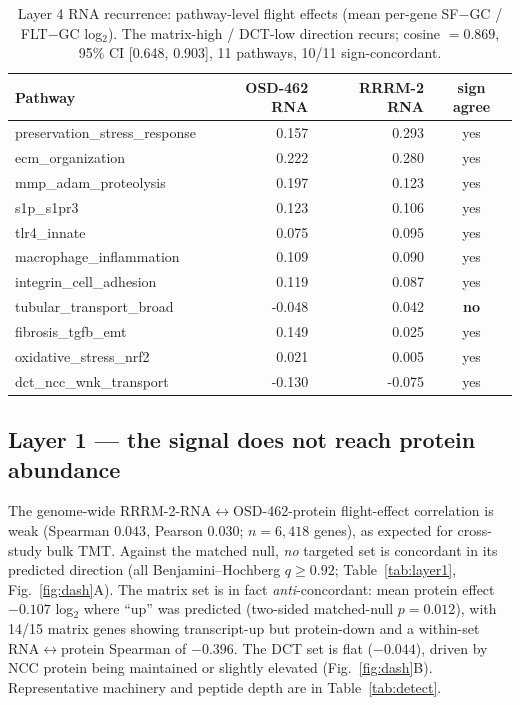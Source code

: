 \documentclass[11pt]{article}
\begin{document}
\begin{table}[htbp]
\centering
\small
\begin{tabular}{lrrc}
\toprule
Pathway & OSD-462 RNA & RRRM-2 RNA & sign agree \\
\midrule
preservation\_stress\_response & 0.157 & 0.293 & yes \\
ecm\_organization & 0.222 & 0.280 & yes \\
mmp\_adam\_proteolysis & 0.197 & 0.123 & yes \\
s1p\_s1pr3 & 0.123 & 0.106 & yes \\
tlr4\_innate & 0.075 & 0.095 & yes \\
macrophage\_inflammation & 0.109 & 0.090 & yes \\
integrin\_cell\_adhesion & 0.119 & 0.087 & yes \\
tubular\_transport\_broad & -0.048 & 0.042 & \textbf{no} \\
fibrosis\_tgfb\_emt & 0.149 & 0.025 & yes \\
oxidative\_stress\_nrf2 & 0.021 & 0.005 & yes \\
dct\_ncc\_wnk\_transport & -0.130 & -0.075 & yes \\
\bottomrule
\end{tabular}
\caption{Layer 4 RNA recurrence: pathway-level flight effects (mean per-gene SF$-$GC / FLT$-$GC log$_2$). The matrix-high / DCT-low direction recurs; cosine $=0.869$, 95\% CI [0.648, 0.903], 11 pathways, 10/11 sign-concordant.}
\label{tab:layer4}
\end{table}

\subsection{Layer 1 --- the signal does not reach protein abundance}
The genome-wide RRRM-2-RNA$\leftrightarrow$OSD-462-protein flight-effect correlation is
weak (Spearman $0.043$, Pearson
$0.030$; $n=6{,}418$ genes), as expected for cross-study bulk
TMT. Against the matched null, \emph{no} targeted set is concordant in its predicted
direction (all Benjamini--Hochberg $q\geq0.92$; Table~\ref{tab:layer1},
Fig.~\ref{fig:dash}A). The matrix set is in fact \emph{anti}-concordant: mean protein
effect $-0.107$ log$_2$ where ``up'' was predicted (two-sided
matched-null $p=0.012$), with 14/15 matrix genes showing transcript-up but
protein-down and a within-set RNA$\leftrightarrow$protein Spearman of
$-0.396$. The DCT set is flat
($-0.044$), driven by NCC protein being maintained or slightly
elevated (Fig.~\ref{fig:dash}B). Representative machinery and peptide depth are in
Table~\ref{tab:detect}.
\end{document}
